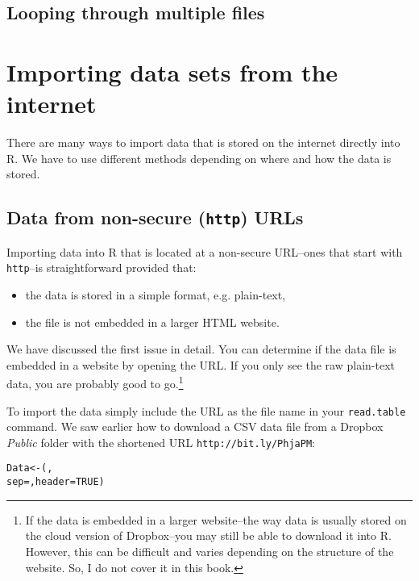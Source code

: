 \subsection{Looping through multiple files}


\section{Importing data sets from the internet}

There are many ways to import data that is stored on the internet directly into R. We have to use different methods depending on where and how the data is stored. 

\subsection{Data from non-secure ({\tt{http}}) URLs}

Importing data into R that is located at a non-secure URL--ones that start with {\tt{http}}--is straightforward provided that:

\begin{itemize}
	\item the data is stored in a simple format, e.g. plain-text,
	\item the file is not embedded in a larger HTML website.
\end{itemize}

We have discussed the first issue in detail. You can determine if the data file is embedded in a website by opening the URL. If you only see the raw plain-text data, you are probably good to go.\footnote{If the data is embedded in a larger website--the way data is usually stored on the cloud version of Dropbox--you may still be able to download it into R. However, this can be difficult and varies depending on the structure of the website. So, I do not cover it in this book.}

To import the data simply include the URL as the file name in your \texttt{read.table} command. We saw earlier how to download a CSV data file from a Dropbox \emph{Public} folder with the shortened URL \texttt{http://bit.ly/PhjaPM}:

\begin{knitrout}
\color{fgcolor}\begin{kframe}
\begin{alltt}
Data <- (, 
					sep = , header = TRUE)
\end{alltt}
\end{kframe}
\end{knitrout}


